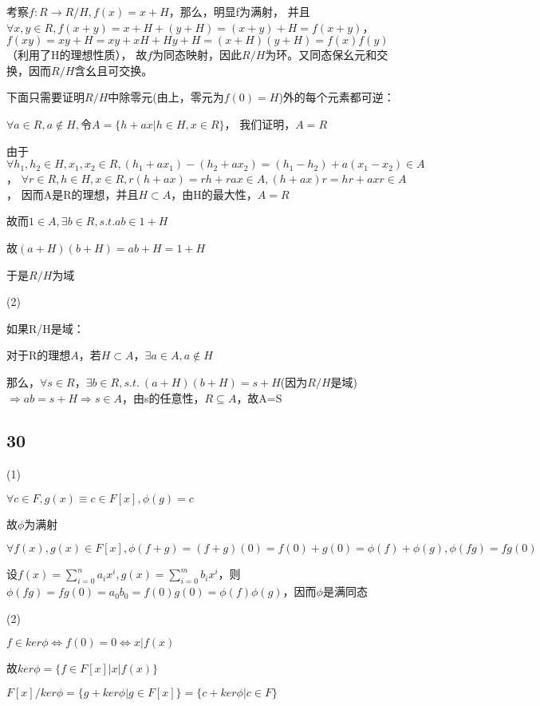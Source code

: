 \documentclass[UTF8]{ctexart}
\begin{document}
考察$f: R\rightarrow R/H, f(x) = x + H$，那么，明显f为满射，
并且$\forall x, y\in R, f(x + y) = x + H + (y + H) = (x + y) + H = f(x + y)$，
$f(xy) = xy + H = xy + xH + Hy + H = (x + H)(y + H) = f(x)f(y)$（利用了H的理想性质），
故$f$为同态映射，因此$R / H$为环。又同态保幺元和交换，因而$R / H$含幺且可交换。

下面只需要证明$R / H$中除零元(由上，零元为$f(0) = H$)外的每个元素都可逆：

$\forall a\in R, a\notin H, $令$A = \{h + ax | h\in H, x\in R\}$，
我们证明，$A=R$

由于$\forall h_1, h_2\in H, x_1, x_2\in R, (h_1 + ax_1) - (h_2 + ax_2) = (h_1 - h_2) + a(x_1 - x_2)\in A$，
$\forall r\in R, h\in H, x\in R, r(h + ax) = rh + rax\in A, (h + ax)r = hr + axr\in A$，
因而A是R的理想，并且$H\subset A$，由H的最大性，$A = R$

故而$1\in A, \exists b\in R, s.t. ab\in 1 + H$

故$(a + H)(b + H) = ab + H = 1 + H$

于是$R / H$为域

(2)

如果R/H是域：

对于R的理想$A$，若$H\subset A$，$\exists a\in A, a\notin H$

那么，$\forall s\in R$，$\exists b\in R, s.t.\ (a + H)(b + H) = s + H$(因为$R / H$是域)$\Rightarrow ab = s + H\Rightarrow s \in A$，由s的任意性，$R\subseteq A$，故A=S

\subsection*{30}

(1)

$\forall c\in F, g(x) \equiv c\in F[x], \phi(g) = c$

故$\phi$为满射

$\forall f(x), g(x)\in F[x], \phi(f + g) = (f + g)(0) = f(0) + g(0) = \phi(f) + \phi(g), \phi(fg) = fg(0)$

设$f(x) = \sum\limits_{i = 0}^n a_ix^i, g(x) = \sum\limits_{i = 0}^m b_ix^i$，则$\phi(fg) = fg(0) = a_0b_0 = f(0)g(0) = \phi(f)\phi(g)$，因而$\phi$是满同态

(2)

$f\in ker\phi \Leftrightarrow f(0) = 0\Leftrightarrow x | f(x)$

故$ker\phi = \{f\in F[x] \Big| x \big| f(x)\}$

$F[x] / ker\phi = \{g + ker\phi\Big| g\in F[x]\} = \{c + ker\phi \Big| c\in F\}$
\end{document}
